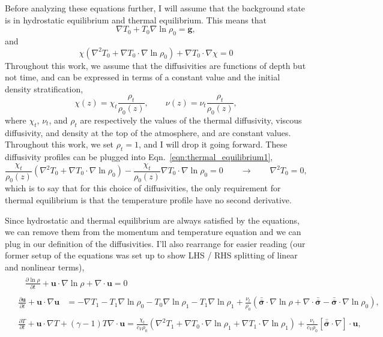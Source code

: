 \documentclass[aps, pre, onecolumn, nofootinbib, notitlepage, groupedaddress, amsfonts, amssymb, amsmath, longbibliography, superscriptaddress]{revtex4-1}
\newcommand{\grad}{\ensuremath{\nabla}}
\newcommand{\lilstressT}{\ensuremath{\bm{\bar{\bar{\sigma}}}}}
\begin{document}
Before analyzing these equations further, I will assume that the background state is in hydrostatic equilibrium and thermal equilibrium.
This means that
\begin{equation}
\grad T_0 + T_0\grad\ln\rho_0 = \bm{g},
\label{eqn:hydrostatic_equilibrium1}
\end{equation}
and
\begin{equation}
\chi (\grad^2 T_0 + \grad T_0 \cdot\grad\ln\rho_0) + \grad T_0 \cdot\grad\chi  = 0
\label{eqn:thermal_equilibrium1}
\end{equation}
Throughout this work, we assume that the diffusivities are functions of depth but not time, and can be expressed in terms of a constant value and the initial density stratification,
$$
\chi(z) = \chi_t \frac{\rho_t}{\rho_0(z)}, \qquad
\nu(z)  = \nu_t  \frac{\rho_t}{\rho_0(z)},
$$
where $\chi_t$, $\nu_t$, and $\rho_t$ are respectively the values of the thermal diffusivity, viscous diffusivity, and density at the top of the atmosphere, and are constant values.
Throughout this work, we set $\rho_t = 1$, and I will drop it going forward.
These diffusivity profiles can be plugged into Eqn.~\ref{eqn:thermal_equilibrium1},
$$
\frac{\chi_t}{\rho_0(z)}(\grad^2 T_0 + \grad T_0 \cdot \grad\ln\rho_0) - \frac{\chi_t}{\rho_0(z)}\grad T_0 \cdot\grad\ln\rho_0 = 0
\qquad\rightarrow\qquad
\grad^2 T_0 = 0,
$$
which is to say that for this choice of diffusivities, the only requirement for thermal equilibrium is that the temperature profile have no second derivative.

Since hydrostatic and thermal equilibrium are always satisfied by the equations, we can remove them from the momentum and temperature equation and we can plug in our definition of the diffusivities.
I'll also rearrange for easier reading (our former setup of the equations was set up to show LHS / RHS splitting of linear and nonlinear terms),
\begin{align}
&\begin{aligned}
&\frac{\partial \ln\rho}{\partial t} + \bm{u}\cdot\grad\ln\rho + \grad\cdot\bm{u}  = 0
	\label{eqn:ab17continuity_eqn2}
\end{aligned}\\
&\begin{aligned}
\frac{\partial\bm{u}}{\partial t} + \bm{u}\cdot\grad\bm{u}
&= - \grad T_1 - T_1\grad\ln\rho_0 - T_0\grad\ln\rho_1 - T_1 \grad\ln\rho_1
+ \frac{\nu_t}{\rho_0}\left(\lilstressT\cdot\grad\ln\rho + \grad\cdot\lilstressT - \lilstressT\cdot\grad\ln\rho_0\right),
\label{eqn:ab17momentum_eqn2}
\end{aligned}\\
&\begin{aligned}
\frac{\partial T}{\partial t} + \bm{u}\cdot\grad T + (\gamma-1)T\grad\cdot\bm{u}
=	\frac{\chi_t}{c_V\rho_0}(\grad^2 T_1 + \grad T_0\cdot\grad\ln\rho_1 + \grad T_1\cdot\grad\ln\rho_1)
	+ \frac{\nu_t }{c_V\rho_0}[\lilstressT\cdot\nabla]\cdot\bm{u}, 
	\label{eqn:ab17energy_eqn2}
\end{aligned}
\end{align}
\end{document}

